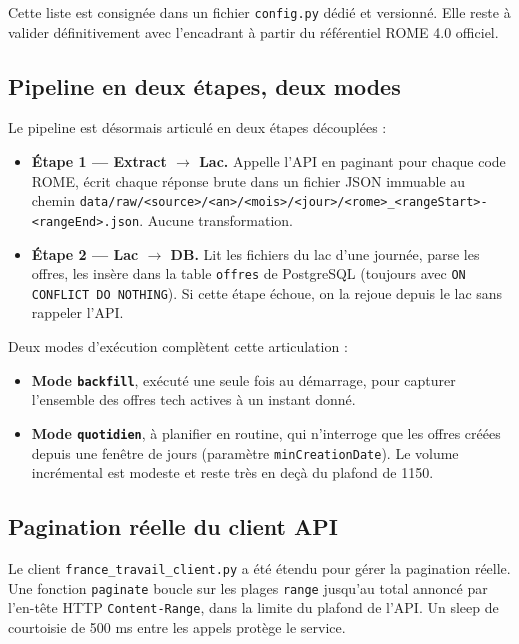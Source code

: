 \documentclass[12pt, a4paper]{article}
\begin{document}
Cette liste est consignée dans un fichier \texttt{config.py} dédié et versionné. Elle reste à valider définitivement avec l'encadrant à partir du référentiel ROME 4.0 officiel.

\subsection{Pipeline en deux étapes, deux modes}

Le pipeline est désormais articulé en deux étapes découplées :

\begin{itemize}
    \item \textbf{Étape 1 — Extract $\rightarrow$ Lac.} Appelle l'API en paginant pour chaque code ROME, écrit chaque réponse brute dans un fichier JSON immuable au chemin \texttt{data/raw/<source>/<an>/<mois>/<jour>/<rome>\_<rangeStart>-<rangeEnd>.json}. Aucune transformation.
    \item \textbf{Étape 2 — Lac $\rightarrow$ DB.} Lit les fichiers du lac d'une journée, parse les offres, les insère dans la table \texttt{offres} de PostgreSQL (toujours avec \texttt{ON CONFLICT DO NOTHING}). Si cette étape échoue, on la rejoue depuis le lac sans rappeler l'API.
\end{itemize}

Deux modes d'exécution complètent cette articulation :

\begin{itemize}
    \item \textbf{Mode \texttt{backfill}}, exécuté une seule fois au démarrage, pour capturer l'ensemble des offres tech actives à un instant donné.
    \item \textbf{Mode \texttt{quotidien}}, à planifier en routine, qui n'interroge que les offres créées depuis une fenêtre de jours (paramètre \texttt{minCreationDate}). Le volume incrémental est modeste et reste très en deçà du plafond de 1150.
\end{itemize}

\subsection{Pagination réelle du client API}

Le client \texttt{france\_travail\_client.py} a été étendu pour gérer la pagination réelle. Une fonction \texttt{paginate} boucle sur les plages \texttt{range} jusqu'au total annoncé par l'en-tête HTTP \texttt{Content-Range}, dans la limite du plafond de l'API. Un sleep de courtoisie de 500 ms entre les appels protège le service.
\end{document}
